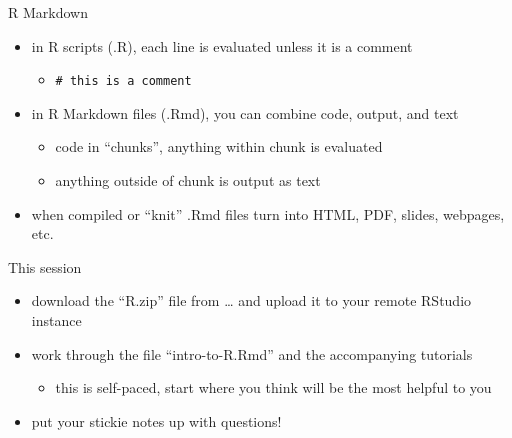 \documentclass[
  ignorenonframetext,
]{beamer}
\providecommand{\tightlist}{%
  \setlength{\itemsep}{0pt}\setlength{\parskip}{0pt}}
\begin{document}
\begin{frame}[fragile]{R Markdown}
\label{r-markdown}
\begin{itemize}
\tightlist
\item
  in R scripts (.R), each line is evaluated unless it is a comment

  \begin{itemize}
  \tightlist
  \item
    \texttt{\#\ this\ is\ a\ comment}
  \end{itemize}
\item
  in R Markdown files (.Rmd), you can combine code, output, and text

  \begin{itemize}
  \tightlist
  \item
    code in ``chunks'', anything within chunk is evaluated
  \item
    anything outside of chunk is output as text
  \end{itemize}
\item
  when compiled or ``knit'' .Rmd files turn into HTML, PDF, slides,
  webpages, etc.
\end{itemize}
\end{frame}

\begin{frame}{This session}
\label{this-session}
\begin{itemize}
\tightlist
\item
  download the ``R.zip'' file from \ldots{} and upload it to your remote
  RStudio instance
\item
  work through the file ``intro-to-R.Rmd'' and the accompanying
  tutorials

  \begin{itemize}
  \tightlist
  \item
    this is self-paced, start where you think will be the most helpful
    to you
  \end{itemize}
\item
  put your stickie notes up with questions!
\end{itemize}
\end{frame}
\end{document}

